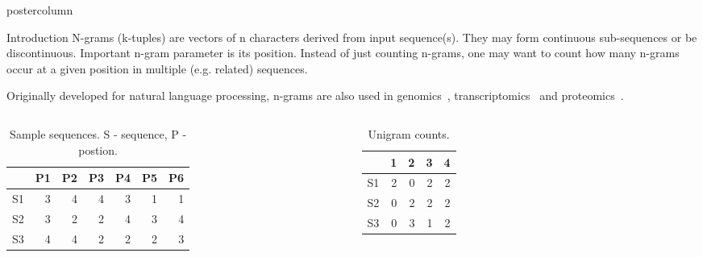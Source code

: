 \documentclass[final]{beamer}\usepackage[]{graphicx}\usepackage[]{color}
\newlength{\columnheight}
\begin{document}
\begin{frame}
  \begin{columns}
    \begin{column}{.47\textwidth}
      \begin{beamercolorbox}[center,wd=\textwidth]{postercolumn}
        \begin{minipage}[T]{.95\textwidth}
          \parbox[t][\columnheight]{\textwidth}
            {
    
        
    \begin{block}{Introduction}
N-grams (k-tuples) are vectors of n characters derived from input sequence(s). They may form continuous sub-sequences or be discontinuous. 
Important n-gram parameter is its position. Instead of just counting n-grams, one may want to count how many n-grams occur at a given position in multiple (e.g. related) sequences.

Originally developed for natural language processing, n-grams are also used in genomics~\citep{fang2011}, transcriptomics~\citep{wang2014} and proteomics~\citep{guo2014}.

\small{
       \begin{columns}[c] %
\begin{table}[ht]
\centering
\begin{tabular}{rrrrrrr}
  \hline
 & P1 & P2 & P3 & P4 & P5 & P6 \\ 
  \hline
S1 & 3 & 4 & 4 & 3 & 1 & 1 \\ 
  S2 & 3 & 2 & 2 & 4 & 3 & 4 \\ 
  S3 & 4 & 4 & 2 & 2 & 2 & 3 \\ 
   \hline
\end{tabular}
\caption{Sample sequences.  S - sequence, P - postion.} 
\end{table}

      
      

    
\begin{table}[ht]
\centering
\begin{tabular}{rrrrr}
  \hline
 & 1 & 2 & 3 & 4 \\ 
  \hline
S1 & 2 & 0 & 2 & 2 \\ 
  S2 & 0 & 2 & 2 & 2 \\ 
  S3 & 0 & 3 & 1 & 2 \\ 
   \hline
\end{tabular}
\caption{Unigram counts.} 
\end{table}



\end{columns}}
\end{block}}
\end{minipage}
\end{beamercolorbox}
\end{column}
\end{columns}
\end{frame}
\end{document}

